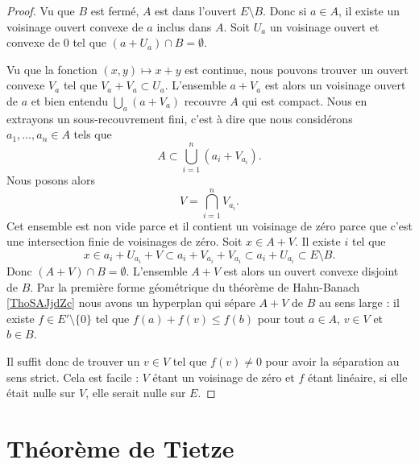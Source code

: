 \begin{proof}
    Vu que \( B\) est fermé, \( A\) est dans l'ouvert \( E\setminus B\). Donc si \( a\in A\), il existe un voisinage ouvert convexe de \( a\) inclus dans \( A\). Soit \( U_a\) un voisinage ouvert et convexe de \( 0\) tel que \( (a+U_a)\cap B=\emptyset\).

    Vu que la fonction \( (x,y)\mapsto x+y\) est continue, nous pouvons trouver un ouvert convexe \( V_a\) tel que \( V_a+V_a\subset U_a\). L'ensemble \( a+V_a\) est alors un voisinage ouvert de \( a\) et bien entendu \( \bigcup_a(a+V_a)\) recouvre \( A\) qui est compact. Nous en extrayons un sous-recouvrement fini, c'est à dire que nous considérons \( a_1,\ldots, a_n\in A\) tels que
    \begin{equation}
        A\subset \bigcup_{i=1}^n(a_i+V_{a_i}).
    \end{equation}
    Nous posons alors 
    \begin{equation}
        V=\bigcap_{i=1}^nV_{a_i}.
    \end{equation}
    Cet ensemble est non vide parce et il contient un voisinage de zéro parce que c'est une intersection finie de voisinages de zéro. Soit \( x\in A+V\). Il existe \( i\) tel que 
    \begin{equation}
        x\in a_i+U_{a_i}+V\subset a_i+V_{a_i}+V_{a_i}\subset a_i+U_{a_i}\subset E\setminus B.
    \end{equation}
    Donc \( (A+V)\cap B=\emptyset\). L'ensemble \( A+V\) est alors un ouvert convexe disjoint de \( B\). Par la première forme géométrique du théorème de Hahn-Banach \ref{ThoSAJjdZc} nous avons un hyperplan qui sépare \( A+V\) de \( B\) au sens large : il existe \( f\in E'\setminus\{ 0 \}\) tel que \( f(a)+f(v)\leq f(b)\) pour tout \( a\in A\), \( v\in V\) et \( b\in B\). 
    
    Il suffit donc de trouver un \( v\in V\) tel que \( f(v)\neq 0\) pour avoir la séparation au sens strict. Cela est facile : \( V\) étant un voisinage de zéro et \( f\) étant linéaire, si elle était nulle sur \( V\), elle serait nulle sur \( E\).
\end{proof}

\section{Théorème de Tietze}

